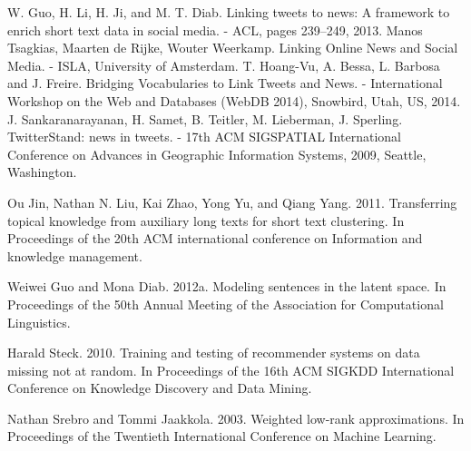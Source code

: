\documentclass[14pt,a4paper,oneside]{extarticle}
\begin{document}
\clearpage
\begin{thebibliography}{0}
     W. Guo, H. Li, H. Ji, and M. T. Diab. Linking tweets to news: A framework to enrich short text data in social media. - ACL, pages 239–249, 2013.
     Manos Tsagkias, Maarten de Rijke, Wouter Weerkamp. Linking Online News and Social Media. - ISLA, University of Amsterdam.
     T. Hoang-Vu, A. Bessa, L. Barbosa and J. Freire. Bridging Vocabularies to Link Tweets and News. - International Workshop on the Web and Databases (WebDB 2014), Snowbird, Utah, US, 2014.
     J. Sankaranarayanan, H. Samet, B. Teitler, M. Lieberman, J. Sperling. TwitterStand: news in tweets. - 17th ACM SIGSPATIAL International Conference on Advances in Geographic Information Systems, 2009, Seattle, Washington.

     Ou Jin, Nathan N. Liu, Kai Zhao, Yong Yu, and Qiang Yang. 2011. Transferring topical knowledge from auxiliary long texts for short text clustering. In Proceedings of the 20th ACM international conference on Information and knowledge management.

     Weiwei Guo and Mona Diab. 2012a. Modeling sentences in the latent space. In Proceedings of the 50th Annual Meeting of the Association for Computational Linguistics. 

     Harald Steck. 2010. Training and testing of recommender systems on data missing not at random. In Proceedings of the 16th ACM SIGKDD International Conference on Knowledge Discovery and Data Mining.

     Nathan Srebro and Tommi Jaakkola. 2003. Weighted low-rank approximations. In Proceedings of the Twentieth International Conference on Machine Learning.

    \hrulefill

\end{thebibliography}
\end{document}
